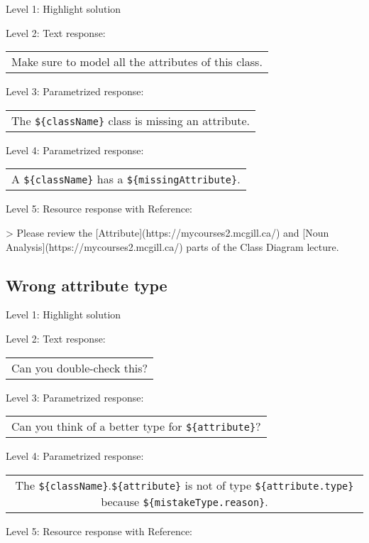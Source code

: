 \noindent Level 1: Highlight solution \medskip

\noindent Level 2: Text response: \medskip

\begin{tabular}{|c}
Make sure to model all the attributes of this class.
\end{tabular} \medskip

\noindent Level 3: Parametrized response: \medskip

\begin{tabular}{|c}
The \verb|${className}| class is missing an attribute.
\end{tabular} \medskip

\noindent Level 4: Parametrized response: \medskip

\begin{tabular}{|c}
A \verb|${className}| has a \verb|${missingAttribute}|.
\end{tabular} \medskip

\noindent Level 5: Resource response with Reference:

> Please review the [Attribute](https://mycourses2.mcgill.ca/) and [Noun Analysis](https://mycourses2.mcgill.ca/) parts of the Class Diagram lecture.


\subsection{Wrong attribute type}

\noindent Level 1: Highlight solution \medskip

\noindent Level 2: Text response: \medskip

\begin{tabular}{|c}
Can you double-check this?
\end{tabular} \medskip

\noindent Level 3: Parametrized response: \medskip

\begin{tabular}{|c}
Can you think of a better type for \verb|${attribute}|?
\end{tabular} \medskip

\noindent Level 4: Parametrized response: \medskip

\begin{tabular}{|c}
The \verb|${className}|.\verb|${attribute}| is not of type \verb|${attribute.type}| because \verb|${mistakeType.reason}|.
\end{tabular} \medskip

\noindent Level 5: Resource response with Reference:

